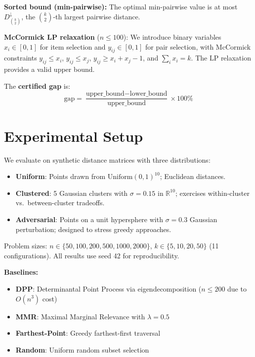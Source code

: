 \documentclass[11pt,a4paper]{article}
\begin{document}
\textbf{Sorted bound (min-pairwise):} The optimal min-pairwise value is at most $D^{\downarrow}_{\binom{k}{2}}$, the $\binom{k}{2}$-th largest pairwise distance.

\textbf{McCormick LP relaxation} ($n \leq 100$): We introduce binary variables $x_i \in [0,1]$ for item selection and $y_{ij} \in [0,1]$ for pair selection, with McCormick constraints $y_{ij} \leq x_i$, $y_{ij} \leq x_j$, $y_{ij} \geq x_i + x_j - 1$, and $\sum_i x_i = k$. The LP relaxation provides a valid upper bound.

The \textbf{certified gap} is:
\begin{equation}
    \text{gap} = \frac{\text{upper\_bound} - \text{lower\_bound}}{\text{upper\_bound}} \times 100\%
\end{equation}

\section{Experimental Setup}

We evaluate on synthetic distance matrices with three distributions:
\begin{itemize}
    \item \textbf{Uniform}: Points drawn from $\text{Uniform}(0,1)^{10}$; Euclidean distances.
    \item \textbf{Clustered}: 5 Gaussian clusters with $\sigma = 0.15$ in $\mathbb{R}^{10}$; exercises within-cluster vs.\ between-cluster tradeoffs.
    \item \textbf{Adversarial}: Points on a unit hypersphere with $\sigma = 0.3$ Gaussian perturbation; designed to stress greedy approaches.
\end{itemize}

Problem sizes: $n \in \{50, 100, 200, 500, 1000, 2000\}$, $k \in \{5, 10, 20, 50\}$ (11 configurations). All results use seed 42 for reproducibility.

\textbf{Baselines:}
\begin{itemize}
    \item \textbf{DPP}: Determinantal Point Process via eigendecomposition ($n \leq 200$ due to $O(n^3)$ cost)
    \item \textbf{MMR}: Maximal Marginal Relevance with $\lambda = 0.5$
    \item \textbf{Farthest-Point}: Greedy farthest-first traversal
    \item \textbf{Random}: Uniform random subset selection
\end{itemize}
\end{document}
